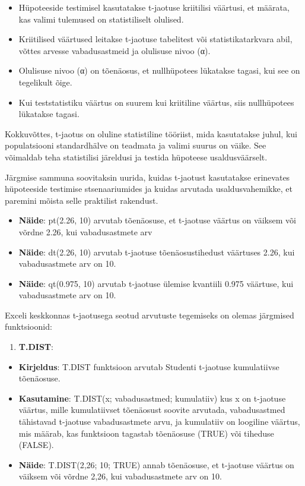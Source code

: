 \documentclass[
]{book}
\providecommand{\tightlist}{%
  \setlength{\itemsep}{0pt}\setlength{\parskip}{0pt}}
\begin{document}
\begin{itemize}
\tightlist
\item
  Hüpoteeside testimisel kasutatakse t-jaotuse kriitilisi väärtusi, et määrata, kas valimi tulemused on statistiliselt olulised.
\item
  Kriitilised väärtused leitakse t-jaotuse tabelitest või statistikatarkvara abil, võttes arvesse vabadusastmeid ja olulisuse nivoo (α).
\item
  Olulisuse nivoo (α) on tõenäosus, et nullhüpotees lükatakse tagasi, kui see on tegelikult õige.
\item
  Kui teststatistiku väärtus on suurem kui kriitiline väärtus, siis nullhüpotees lükatakse tagasi.
\end{itemize}

Kokkuvõttes, t-jaotus on oluline statistiline tööriist, mida kasutatakse juhul, kui populatsiooni standardhälve on teadmata ja valimi suurus on väike. See võimaldab teha statistilisi järeldusi ja testida hüpoteese usaldusväärselt.

Järgmise sammuna soovitaksin uurida, kuidas t-jaotust kasutatakse erinevates hüpoteeside testimise stsenaariumides ja kuidas arvutada usaldusvahemikke, et paremini mõista selle praktilist rakendust.

\begin{itemize}
\tightlist
\item
  \textbf{Näide}: pt(2.26, 10) arvutab tõenäosuse, et t-jaotuse väärtus on väiksem või võrdne 2.26, kui vabadusastmete arv\\
\item
  \textbf{Näide}: dt(2.26, 10) arvutab t-jaotuse tõenäosustihedust väärtuses 2.26, kui vabadusastmete arv on 10.
\item
  \textbf{Näide}: qt(0.975, 10) arvutab t-jaotuse ülemise kvantiili 0.975 väärtuse, kui vabadusastmete arv on 10.
\end{itemize}

Exceli keskkonnas t-jaotusega seotud arvutuste tegemiseks on olemas järgmised funktsioonid:

\begin{enumerate}
\def\labelenumi{\arabic{enumi}.}
\tightlist
\item
  \textbf{T.DIST}:
\end{enumerate}

\begin{itemize}
\tightlist
\item
  \textbf{Kirjeldus}: T.DIST funktsioon arvutab Studenti t-jaotuse kumulatiivse tõenäosuse.
\item
  \textbf{Kasutamine}: T.DIST(x; vabadusastmed; kumulatiiv) kus x on t-jaotuse väärtus, mille kumulatiivset tõenäosust soovite arvutada, vabadusastmed tähistavad t-jaotuse vabadusastmete arvu, ja kumulatiiv on loogiline väärtus, mis määrab, kas funktsioon tagastab tõenäosuse (TRUE) või tiheduse (FALSE).
\item
  \textbf{Näide}: T.DIST(2,26; 10; TRUE) annab tõenäosuse, et t-jaotuse väärtus on väiksem või võrdne 2,26, kui vabadusastmete arv on 10.
\end{itemize}
\end{document}
